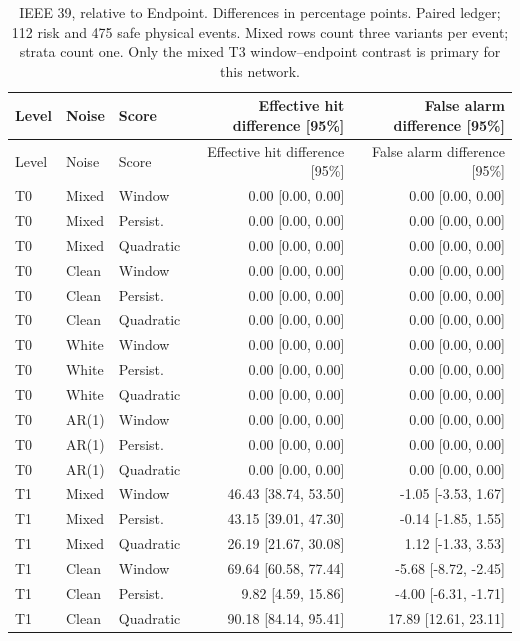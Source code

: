 \documentclass[10pt]{article}
\begin{document}
\begingroup\small\setlength{\tabcolsep}{3.8pt}
\begin{longtable}{lllrr}
\caption{IEEE 39, relative to Endpoint. Differences in percentage points. Paired ledger; 112 risk and 475 safe physical events. Mixed rows count three variants per event; strata count one. Only the mixed T3 window--endpoint contrast is primary for this network.}\\
\toprule Level & Noise & Score & Effective hit difference [95\%] & False alarm difference [95\%] \\\midrule\endfirsthead
\toprule Level & Noise & Score & Effective hit difference [95\%] & False alarm difference [95\%] \\\midrule\endhead
T0 & Mixed & Window & 0.00 [0.00, 0.00] & 0.00 [0.00, 0.00] \\
T0 & Mixed & Persist. & 0.00 [0.00, 0.00] & 0.00 [0.00, 0.00] \\
T0 & Mixed & Quadratic & 0.00 [0.00, 0.00] & 0.00 [0.00, 0.00] \\
T0 & Clean & Window & 0.00 [0.00, 0.00] & 0.00 [0.00, 0.00] \\
T0 & Clean & Persist. & 0.00 [0.00, 0.00] & 0.00 [0.00, 0.00] \\
T0 & Clean & Quadratic & 0.00 [0.00, 0.00] & 0.00 [0.00, 0.00] \\
T0 & White & Window & 0.00 [0.00, 0.00] & 0.00 [0.00, 0.00] \\
T0 & White & Persist. & 0.00 [0.00, 0.00] & 0.00 [0.00, 0.00] \\
T0 & White & Quadratic & 0.00 [0.00, 0.00] & 0.00 [0.00, 0.00] \\
T0 & AR(1) & Window & 0.00 [0.00, 0.00] & 0.00 [0.00, 0.00] \\
T0 & AR(1) & Persist. & 0.00 [0.00, 0.00] & 0.00 [0.00, 0.00] \\
T0 & AR(1) & Quadratic & 0.00 [0.00, 0.00] & 0.00 [0.00, 0.00] \\
T1 & Mixed & Window & 46.43 [38.74, 53.50] & -1.05 [-3.53, 1.67] \\
T1 & Mixed & Persist. & 43.15 [39.01, 47.30] & -0.14 [-1.85, 1.55] \\
T1 & Mixed & Quadratic & 26.19 [21.67, 30.08] & 1.12 [-1.33, 3.53] \\
T1 & Clean & Window & 69.64 [60.58, 77.44] & -5.68 [-8.72, -2.45] \\
T1 & Clean & Persist. & 9.82 [4.59, 15.86] & -4.00 [-6.31, -1.71] \\
T1 & Clean & Quadratic & 90.18 [84.14, 95.41] & 17.89 [12.61, 23.11] \\

\end{longtable}
\end{document}
